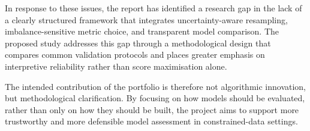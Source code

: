\documentclass[11pt,a4paper]{article}
\begin{document}
In response to these issues, the report has identified a research gap in the lack of a clearly structured framework that integrates uncertainty-aware resampling, imbalance-sensitive metric choice, and transparent model comparison. The proposed study addresses this gap through a methodological design that compares common validation protocols and places greater emphasis on interpretive reliability rather than score maximisation alone.

The intended contribution of the portfolio is therefore not algorithmic innovation, but methodological clarification. By focusing on how models should be evaluated, rather than only on how they should be built, the project aims to support more trustworthy and more defensible model assessment in constrained-data settings.



\end{document}

